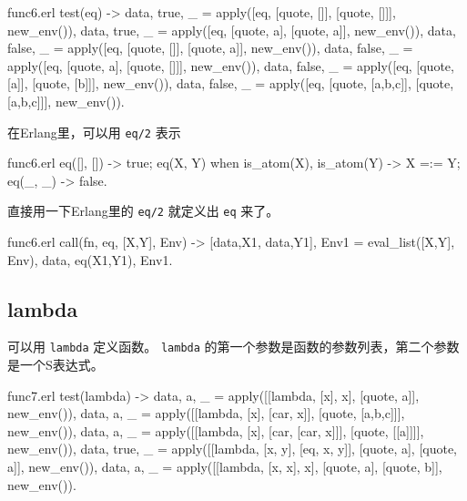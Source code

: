 \documentclass[preview,multi,crop=false,border=1in,class=memoir]{standalone}
\begin{document}
\begin{preview-page}
\begin{SourceCode}[148][166]{func6.erl}
test(eq) ->
    {{data, true}, _} =
        apply([eq, [quote, []], [quote, []]],
              new_env()),
    {{data, true}, _} =
        apply([eq, [quote, a], [quote, a]],
              new_env()),
    {{data, false}, _} =
        apply([eq, [quote, []], [quote, a]],
              new_env()),
    {{data, false}, _} =
        apply([eq, [quote, a], [quote, []]],
              new_env()),
    {{data, false}, _} =
        apply([eq, [quote, [a]], [quote, [b]]],
              new_env()),
    {{data, false}, _} =
        apply([eq, [quote, [a,b,c]], [quote, [a,b,c]]],
              new_env()).
\end{SourceCode}

在Erlang里，可以用 \verb|eq/2| 表示

\begin{SourceCode}[75][81]{func6.erl}
eq([], []) ->
    true;
eq(X, Y)
  when is_atom(X), is_atom(Y) ->
    X =:= Y;
eq(_, _) ->
    false.
\end{SourceCode}


直接用一下Erlang里的 \verb|eq/2| 就定义出 \verb|eq| 来了。

\begin{SourceCode}[50][53]{func6.erl}
call({fn, eq}, [X,Y], Env) ->
    {[{data,X1}, {data,Y1}], Env1} =
        eval_list([X,Y], Env),
    {{data, eq(X1,Y1)}, Env1}.
\end{SourceCode}

\subsection{lambda}

可以用 \verb|lambda| 定义函数。 \verb|lambda| 的第一个参数是函数的参数列表，第二个参数是一个S表达式。

\begin{SourceCode}[186][203]{func7.erl}
test(lambda) ->
    {{data, a}, _} =
        apply([[lambda, [x], x],
               [quote, a]], new_env()),
    {{data, a}, _} =
        apply([[lambda, [x], [car, x]],
               [quote, [a,b,c]]], new_env()),
    {{data, a}, _} =
        apply([[lambda, [x], [car, [car, x]]],
               [quote, [[a]]]], new_env()),
    {{data, true}, _} =
        apply([[lambda, [x, y], [eq, x, y]],
               [quote, a],
               [quote, a]], new_env()),
    {{data, a}, _} =
        apply([[lambda, [x, x], x],
               [quote, a],
               [quote, b]], new_env()).
\end{SourceCode}



\end{preview-page}
\end{document}
